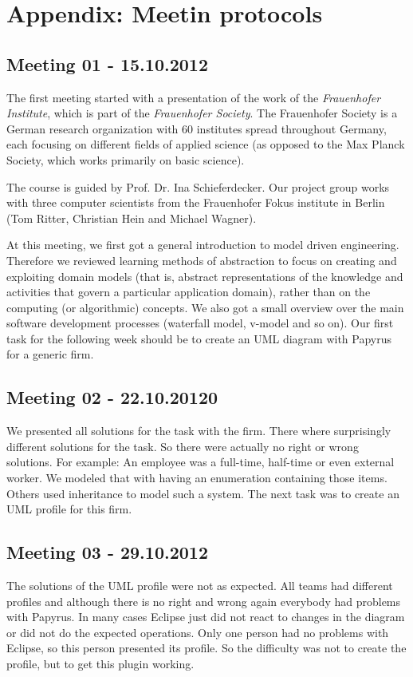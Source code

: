 \appendix
\chapter{Appendix: Meetin protocols} \label{sec:appendix}

\section{Meeting 01 - 15.10.2012}
The first meeting started with a presentation of the work of the \emph{Frauenhofer Institute}, which is part of the \emph{Frauenhofer Society}. The Frauenhofer Society is a German research organization with $60$ institutes spread throughout Germany, each focusing on different fields of applied science (as opposed to the Max Planck Society, which works primarily on basic science).

The course is guided by Prof. Dr. Ina Schieferdecker. Our project group works with three computer scientists from the Frauenhofer Fokus institute in Berlin (Tom Ritter, Christian Hein and Michael Wagner).

At this meeting, we first got a general introduction to model driven engineering. Therefore we reviewed learning methods of abstraction to focus on creating and exploiting domain models (that is, abstract representations of the knowledge and activities that govern a particular application domain), rather than on the computing (or algorithmic) concepts. We also got a small overview over the main software development processes (waterfall model, v-model and so on). Our first task for the following week should be to create an UML diagram with Papyrus for a generic firm.

\section{Meeting 02 - 22.10.20120}
We presented all solutions for the task with the firm. There where surprisingly different solutions for the task. So there were actually no right or wrong solutions. For example: An employee was a full-time, half-time or even external worker. We modeled that with having an enumeration containing those items. Others used inheritance to model such a system. The next task was to create an UML profile for this firm.

\section{Meeting 03 - 29.10.2012}
The solutions of the UML profile were not as expected. All teams had different profiles and although there is no right and wrong again everybody had problems with Papyrus. In many cases Eclipse just did not react to changes in the diagram or did not do the expected operations. Only one person had no problems with Eclipse, so this person presented its profile. So the difficulty was not to create the profile, but to get this plugin working.

